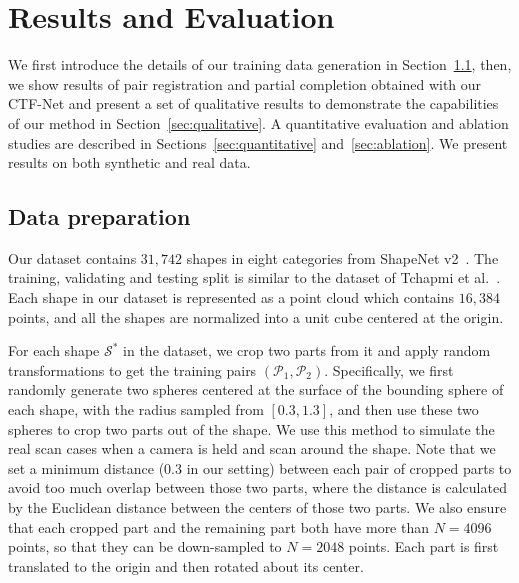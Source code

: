 \section{Results and Evaluation} \label{sec:results}



We first introduce the details of our training data generation in Section~\ref{sec:data}, then, we show results of pair registration and partial completion obtained with our CTF-Net and present a set of qualitative results to demonstrate the capabilities of our method in Section~\ref{sec:qualitative}.
A quantitative evaluation and ablation studies are described in Sections~\ref{sec:quantitative} and~\ref{sec:ablation}. We present results on both synthetic and real data.


\subsection{Data preparation}
\label{sec:data}

Our dataset contains $31,742$ shapes in eight categories from ShapeNet v2~. The training, validating and testing split is similar to the dataset of Tchapmi et al.~. Each shape in our dataset is represented as a point cloud which contains $16,384$ points, and all the shapes are normalized into a unit cube centered at the origin.

For each shape $\mathcal{S}^*$ in the dataset, we crop two parts from it and apply random transformations to get the training pairs $(\mathcal{P}_1, \mathcal{P}_2)$. Specifically, we first randomly generate two spheres centered at the surface of the bounding sphere of each shape, with the radius sampled from $[0.3,1.3]$, and then use these two spheres to crop two parts out of the shape. We use this method to simulate the real scan cases when a camera is held and scan around the shape. Note that we set a minimum distance ($0.3$ in our setting) between each pair of cropped parts to avoid too much overlap between those two parts, where the distance is calculated by the Euclidean distance between the centers of those two parts. We also ensure that each cropped part and the remaining part both have more than $N=4096$ points, so that they can be down-sampled to $N=2048$ points.
Each part is first translated to the origin and then rotated about its center. 

